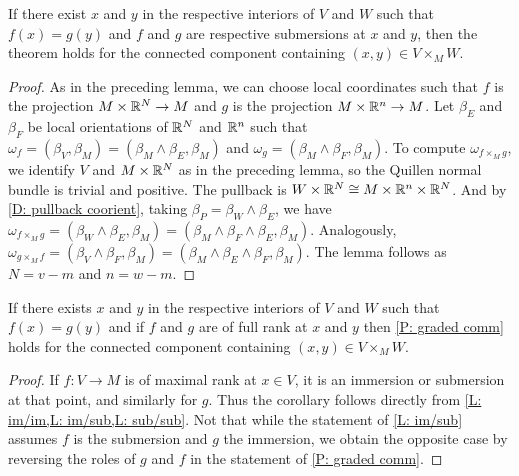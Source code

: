 \begin{lemma}\label{L: sub/sub}
If there exist $x$ and $y$ in the respective interiors of $V$ and $W$ such that  $f(x)=g(y)$ and $f$ and $g$ are respective submersions at $x$ and $y$, then the theorem holds for the connected component containing $(x,y)\in V\times_MW$. 
\end{lemma}
\begin{proof}
As in the preceding lemma, we can choose local coordinates such that $f$ is the projection $M\times \mathbb{R}^N\to M$ and $g$ is the projection $M\times \mathbb{R}^n\to M$. Let $\beta_E$ and $\beta_F$ be local orientations of $\mathbb{R}^N$ and $\mathbb{R}^n$ such that $\omega_f=(\beta_V,\beta_M)=(\beta_M\wedge \beta_E,\beta_M)$ and $\omega_g=(\beta_M\wedge \beta_F,\beta_M)$. To compute $\omega_{f\times_Mg}$, we identify $V$ and $M\times \mathbb{R}^N$ as in the preceding lemma, so the Quillen normal bundle is trivial and positive. The pullback is $W\times \mathbb{R}^N\cong M\times \mathbb{R}^n\times \mathbb{R}^N$. And by \cref{D: pullback coorient}, taking $\beta_P=\beta_W\wedge \beta_E$, we have  $\omega_{f\times_Mg}=(\beta_W\wedge \beta_E,\beta_M)=(\beta_M\wedge \beta_F\wedge \beta_E,\beta_M)$. Analogously, $\omega_{g\times_Mf}=(\beta_V\wedge \beta_F,\beta_M)=(\beta_M\wedge \beta_E\wedge \beta_F,\beta_M)$. The lemma follows as $N=v-m$ and $n=w-m$.
\end{proof}

\begin{corollary}\label{C: if full}
If there exists $x$ and $y$ in the respective interiors of $V$ and $W$ such that  $f(x)=g(y)$ and if $f$ and $g$ are of full rank at $x$ and $y$ then \cref{P: graded comm} holds for the connected component containing $(x,y)\in V\times_MW$.
\end{corollary}


\begin{proof}
If $f:V\to M$ is of maximal rank at $x\in V$, it is an immersion or submersion at that point, and similarly for $g$. Thus the corollary follows directly from \cref{L: im/im,L: im/sub,L: sub/sub}. Not that while the statement of \cref{L: im/sub} assumes $f$ is the submersion and $g$ the immersion, we obtain the opposite case by reversing the roles of $g$ and $f$ in the statement of \cref{P: graded comm}.
\end{proof}

\begin{comment}
 If they are both immersions, apply Lemma \ref{L: im/im}. If $f$ is a submersion, it is also a submersion in a neighborhood of $U$ and so it is a submersion on a neighborhood $U$ of $x$. Let $A$ be the intersection of $U$ with the interior of $V$. 
By the transversality of $f$ and $g$, if $g(y)=f(x)$, there must be points in a neighborhood of $B$ of $y$ in $W$ that map to $f(A)$, and as a map is a submersion or immersion on an open set, there is a $y'$ in the interior of $B$ that maps to $f(A)$. Taking $x'$ in $f^{-1}(y')$, if $g$ is an immersion we apply Lemma \ref{L: im/sub} to $x', y'$, and if $g$ is a submersion we apply Lemma \ref{L: sub/sub}.
If $f$ is an immersion and $g$ a submersion, we reverse the roles in the argument.
\end{comment}



